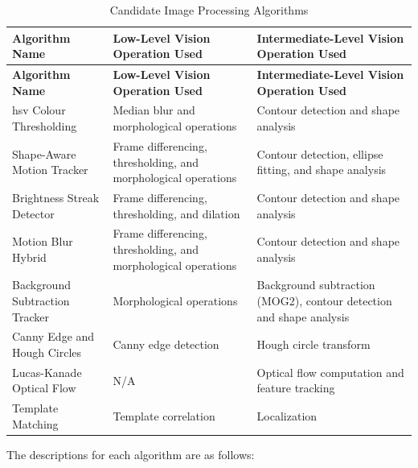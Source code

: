 \documentclass[12pt,a4paper]{article}
\begin{document}
\begin{longtable}{@{} p{} p{} p{} @{}}
\caption{Candidate Image Processing Algorithms}
\label{tab:candidate_algorithms} \\
    \toprule
    \textbf{Algorithm Name} & \textbf{Low-Level Vision Operation Used} & \textbf{Intermediate-Level Vision Operation Used} \\
    \midrule
    \endfirsthead
    \toprule
    \textbf{Algorithm Name} & \textbf{Low-Level Vision Operation Used} & \textbf{Intermediate-Level Vision Operation Used} \\
    \midrule
    \endhead
    \bottomrule
    \endfoot
    \bottomrule
    \endlastfoot
    \acs{hsv} Colour Thresholding & Median blur and morphological operations & Contour detection and shape analysis \\
    
    Shape-Aware Motion Tracker & Frame differencing, thresholding, and morphological operations & Contour detection, ellipse fitting, and shape analysis \\
    
    Brightness Streak Detector & Frame differencing, thresholding, and dilation & Contour detection and shape analysis \\
    
    Motion Blur Hybrid & Frame differencing, thresholding, and morphological operations & Contour detection and shape analysis \\
    
    Background Subtraction Tracker & Morphological operations & Background subtraction (MOG2), contour detection and shape analysis \\
    
    Canny Edge and Hough Circles & Canny edge detection & Hough circle transform \\
    
    Lucas-Kanade Optical Flow & N/A & Optical flow computation and feature tracking \\
    
    Template Matching & Template correlation & Localization \\
\end{longtable}

The descriptions for each algorithm are as follows:
\end{document}
